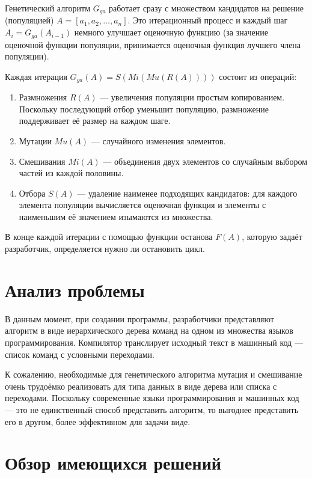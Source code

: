 \documentclass[a4paper,14pt]{extarticle}
\begin{document}
Генетический алгоритм $G_{ga}$ работает сразу с множеством кандидатов на решение
(популяцией) $A = [a_1, a_2, …, a_n]$. Это итерационный процесс и каждый шаг
$A_i = G_{ga}(A_{i-1})$ немного улучшает оценочную функцию (за значение
оценочной функции популяции, принимается оценочная функция лучшего члена
популяции).

Каждая итерация $G_{ga}(A) = S(Mi(Mu(R(A))))$ состоит из
операций:\cite{reinforcement}
\begin{enumerate}
  \item Размножения $R(A)$ — увеличения популяции простым копированием.
        Поскольку последующий отбор уменьшит популяцию, размножение поддерживает
        её размер на каждом шаге.
  \item Мутации $Mu(A)$ — случайного изменения элементов.
  \item Смешивания $Mi(A)$ — объединения двух элементов со случайным выбором
        частей из каждой половины.
  \item Отбора $S(A)$ — удаление наименее подходящих кандидатов: для каждого
        элемента популяции вычисляется оценочная функция и элементы с
        наименьшим её значением изымаются из множества.
\end{enumerate}

В конце каждой итерации с помощью функции останова $F(A)$, которую задаёт
разработчик, определяется нужно ли остановить цикл.

\section{Анализ проблемы}
В данным момент, при создании программы, разработчики представляют алгоритм в
виде иерархического дерева команд на одном из множества языков программирования.
Компилятор транслирует исходный текст в машинный код — список команд с условными
переходами.

К сожалению, необходимые для генетического алгоритма мутация и смешивание очень
трудоёмко реализовать для типа данных в виде дерева или списка с переходами.
Поскольку современные языки программирования и машинных код — это не
единственный способ представить алгоритм, то выгоднее представить его в другом,
более эффективном для задачи виде.

\section{Обзор имеющихся решений}
\end{document}
